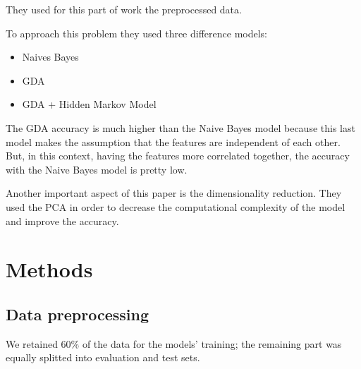 \documentclass[a4paper,10pt,oneside]{article}
\begin{document}
They used for this part of work the preprocessed data.

To approach this problem they used three difference models:
\begin{itemize}
 \item Naives Bayes
 \item GDA
 \item GDA + Hidden Markov Model
\end{itemize}

The GDA accuracy is much higher than the Naive Bayes model because this last model makes the assumption that the features are independent of each other. But, in this context, having the features more correlated together, the accuracy with the Naive Bayes model is pretty low.

Another important aspect of this paper is the dimensionality reduction. They used the PCA in order to decrease the computational complexity of the model and improve the accuracy.


\section{Methods}

\subsection{Data preprocessing}
We retained 60\% of the data for the models' training; the remaining part was equally splitted into evaluation and test sets.
 
\end{document}

